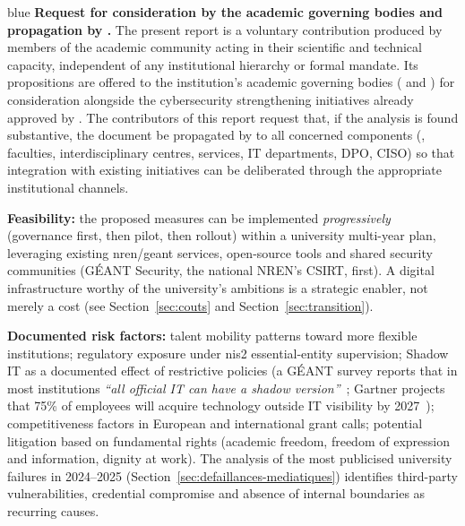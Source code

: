 \begin{stakeholderbox}{blue}
\medskip
\textbf{Request for consideration by the academic governing bodies and
propagation by .} The present
report is a voluntary contribution produced by members of the
academic community acting in their scientific and technical
capacity, independent of any institutional hierarchy or formal
mandate. Its propositions are offered to the institution's academic
governing bodies ( and ) for
consideration alongside the cybersecurity strengthening initiatives
already approved by . The contributors of
this report request that, if the analysis is found substantive,
the document be propagated by  to all
concerned components (, faculties, interdisciplinary
centres, services, IT departments, DPO, CISO) so that integration
with existing initiatives can be deliberated through the
appropriate institutional channels.

\medskip
\textbf{Feasibility:} the proposed measures can be implemented
\emph{progressively} (governance first, then pilot, then rollout)
within a university multi-year plan, leveraging existing
\gls{nren}/\gls{geant} services, open-source tools and shared
security communities (G\'EANT Security, the national NREN's CSIRT,
\gls{first}). A digital infrastructure worthy of the university's
ambitions is a strategic enabler, not merely a cost
(see Section~\ref{sec:couts} and Section~\ref{sec:transition}).

\medskip
\textbf{Documented risk factors:} talent mobility patterns toward
more flexible institutions; regulatory exposure under \gls{nis2}
essential-entity supervision; Shadow IT as a documented effect of
restrictive policies (a G\'EANT survey reports that in most
institutions \emph{``all official IT can have a shadow
version''}~\cite{geant-shadow-it}; Gartner projects that 75\% of
employees will acquire technology outside IT visibility by
2027~\cite{gartner-shadow-it}); competitiveness factors in
European and international grant calls; potential litigation based
on fundamental rights (academic freedom, freedom of expression and
information, dignity at work). The analysis of the most publicised
university failures in 2024--2025
(Section~\ref{sec:defaillances-mediatiques}) identifies third-party
vulnerabilities, credential compromise and absence of internal
boundaries as recurring causes.


\end{stakeholderbox}
